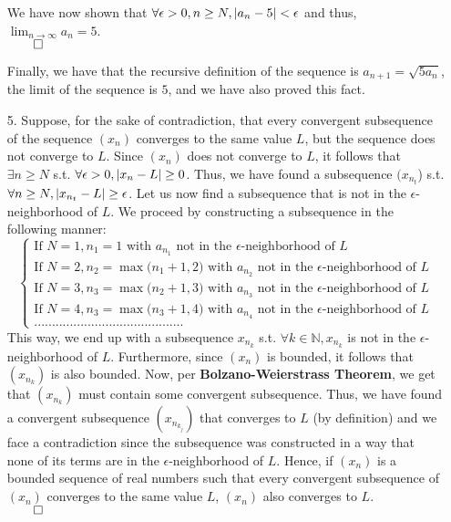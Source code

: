 \documentclass[11pt]{article}
\DeclarePairedDelimiter\abs{\lvert}{\rvert}%
\newcommand{\nats}{\mathbb{N}}
\begin{document}
\begin{itemize}
            We have now shown that $\forall \epsilon > 0, n \geq N, \abs{a_n - 5}
            < \epsilon$ and thus, $\displaystyle\lim_{n \to \infty} a_n = 5$.\\
            $\qed$

            Finally, we have that the recursive definition of the sequence is
            $a_{n + 1} = \sqrt{5a_{n}}$, the limit of the sequence is $5$, and
            we have also proved this fact.

        \newpage
        \item[5.]
            Suppose, for the sake of contradiction, that every convergent
            subsequence of the sequence $(x_n)$ converges to the same value
            $L$, but the sequence does not converge to $L$. Since $(x_n)$ does
            not converge to $L$, it follows that $\exists n \geq N$ s.t.
            $\forall \epsilon > 0, \abs{x_n - L} \geq 0$. Thus, we have found a
            subsequence $(x_{n_t}$) s.t. $\forall n \geq N, \abs{x_{n_t} - L}
            \geq \epsilon$. Let us now find a subsequence that is not in the
            $\epsilon$-neighborhood of $L$. We proceed by constructing a
            subsequence in the following manner:
            \begin{equation*}
                \begin{cases}
                    \text{If } N = 1, n_1 = 1                  \text{ with } a_{n_1} \text{ not in the $\epsilon$-neighborhood of } L\\
                    \text{If } N = 2, n_2 = \max{(n_1 + 1, 2}) \text{ with } a_{n_2} \text{ not in the $\epsilon$-neighborhood of } L\\
                    \text{If } N = 3, n_3 = \max{(n_2 + 1, 3}) \text{ with } a_{n_3} \text{ not in the $\epsilon$-neighborhood of } L\\
                    \text{If } N = 4, n_3 = \max{(n_3 + 1, 4}) \text{ with } a_{n_4} \text{ not in the $\epsilon$-neighborhood of } L\\
                    ..........................................
                \end{cases}
            \end{equation*}
            This way, we end up with a subsequence $x_{n_k}$ s.t. $\forall k
            \in \nats, x_{n_k}$ is not in the $\epsilon$-neighborhood of $L$.
            Furthermore, since $(x_n)$ is bounded, it follows that $(x_{n_k})$
            is also bounded. Now, per \textbf{Bolzano-Weierstrass Theorem}, we
            get that $(x_{n_k})$ must contain some convergent subsequence.
            Thus, we have found a convergent subsequence $(x_{n_{k_j}})$ that
            converges to $L$ (by definition) and we face a contradiction since
            the subsequence was constructed in a way that none of its terms are
            in the $\epsilon$-neighborhood of $L$. Hence, if $(x_n)$ is a
            bounded sequence of real numbers such that every convergent
            subsequence of $(x_n)$ converges to the same value $L$, $(x_n)$
            also converges to $L$.\\
            $\qed$


\end{itemize}
\end{document}
